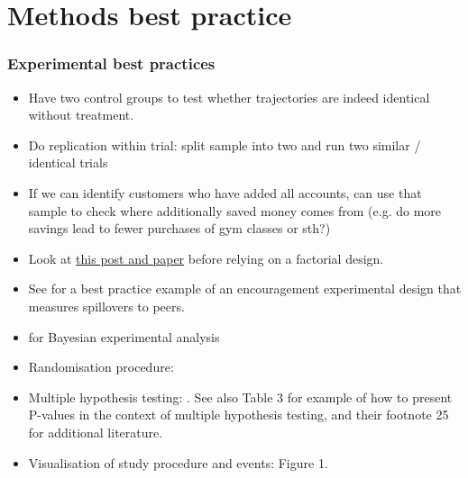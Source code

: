 

\section{Methods best practice}


\subsubsection*{Experimental best practices}

\begin{itemize}

    \item Have two control groups to test whether trajectories are indeed
        identical without treatment.

    \item Do replication within trial: split sample into two and run two
        similar / identical trials \citep{hershfield2019temporal}

    \item If we can identify customers who have added all accounts, can use
        that sample to check where additionally saved money comes from (e.g. do
        more savings lead to fewer purchases of gym classes or sth?)

    \item Look at
        \href{https://blogs.worldbank.org/impactevaluations/be-careful-inference-2x2-experiments-and-other-cross-cutting-designs}{this
        post and paper} before relying on a factorial design.

    \item See \citet{duflO2003role} for a best practice example of an
        encouragement experimental design that measures spillovers to peers.

    \item \citet{dehejia2005program} for Bayesian experimental analysis

    \item Randomisation procedure: \citet{bruhn2009pursuit}

    \item Multiple hypothesis testing: \citet{list2019multiple}. See also
        \citet{blumenstock2018defaults} Table 3 for example of how to present
        P-values in the context of multiple hypothesis testing, and their
        footnote 25 for additional literature.

    \item Visualisation of study procedure and events:
        \citet{blumenstock2018defaults} Figure 1.

\end{itemize}



